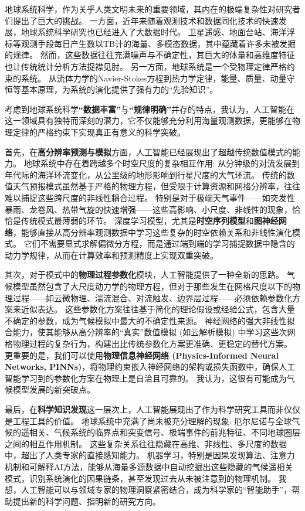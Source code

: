 \documentclass[12pt, a4paper]{article}
\begin{document}
地球系统科学，作为关乎人类文明未来的重要领域，其内在的极端复杂性对研究者们提出了巨大的挑战。
一方面，近年来随着观测技术和数据同化技术的快速发展，地球系统科学研究也已经进入了大数据时代。
卫星遥感、地面台站、海洋浮标等观测手段每日产生数以TB计的海量、多模态数据，其中蕴藏着许多未被发掘的规律。
然而，这些数据往往充满噪声与不确定性，其巨大的体量和高维度特征也让传统统计分析方法捉襟见肘。
另一方面，地球系统是一个受物理定律严格约束的系统。
从流体力学的Navier-Stokes方程到热力学定律，能量、质量、动量守恒等基本原理，为系统的演化提供了强有力的“先验知识”。

考虑到地球系统科学\textbf{“数据丰富”}与\textbf{“规律明确”}并存的特点，我认为，人工智能在这一领域具有独特而深刻的潜力，它不仅能够充分利用海量观测数据，更能够在物理定律的严格约束下实现真正有意义的科学突破。

首先，在\textbf{高分辨率预测与模拟}方面，人工智能已经展现出了超越传统数值模式的能力。
地球系统中存在着跨越多个时空尺度的复杂相互作用: 从分钟级的对流发展到年代际的海洋环流变化，从公里级的地形影响到行星尺度的大气环流。
传统的数值天气预报模式虽然基于严格的物理方程，但受限于计算资源和网格分辨率，往往难以捕捉这些跨尺度的非线性耦合过程。
特别是对于极端天气事件——如突发性暴雨、龙卷风、热带气旋的快速增强——这些高影响、小尺度、非线性的现象，恰恰是传统模式最薄弱的环节。
深度学习模型，尤其是\textbf{时空序列模型}和\textbf{图神经网络}，能够直接从高分辨率观测数据中学习这些复杂的时空依赖关系和非线性演化模式。
它们不需要显式求解偏微分方程，而是通过端到端的学习捕捉数据中隐含的动力学规律，从而在计算效率和预测精度上实现双重突破。

其次，对于模式中的\textbf{物理过程参数化}模块，人工智能提供了一种全新的思路。
气候模型虽然包含了大尺度动力学的物理方程，但对于那些发生在网格尺度以下的物理过程——如云微物理、湍流混合、对流触发、边界层过程——必须依赖参数化方案来近似表达。
这些参数化方案往往基于简化的理论假设或经验公式，包含大量不确定的参数，成为气候模拟中最大的不确定性来源。
神经网络的强大非线性拟合能力，使其能够从高分辨率的“真实”数值模拟 (如云解析模拟) 中学习这些次网格物理过程的复杂行为，构建出比传统参数化方案更准确、更稳定的替代方案。
更重要的是，我们可以使用\textbf{物理信息神经网络 (Physics-Informed Neural Networks, PINNs)}，将物理约束嵌入神经网络的架构或损失函数中，确保人工智能学习到的参数化方案在物理上是自洽且可靠的。
我认为，这很有可能成为气候模型发展的新突破点。

最后，在\textbf{科学知识发现}这一层次上，人工智能展现出了作为科学研究工具而非仅仅是工程工具的价值。
地球系统中充满了尚未被充分理解的现象: 厄尔尼诺与全球气候的遥相关、气候系统的临界点和突变信号、极端事件的前兆特征、不同地球圈层之间的相互作用机制。
这些复杂关系往往隐藏在高维、非线性、多尺度的数据中，超出了人类专家的直接感知能力。
机器学习，特别是因果发现算法、注意力机制和可解释AI方法，能够从海量多源数据中自动挖掘出这些隐藏的气候遥相关模式，识别系统演化的因果链条，甚至发现过去从未被注意到的物理机制。
我想，人工智能可以与领域专家的物理洞察紧密结合，成为科学家的“智能助手”，帮助提出新的科学问题、指明新的研究方向。
\end{document}
